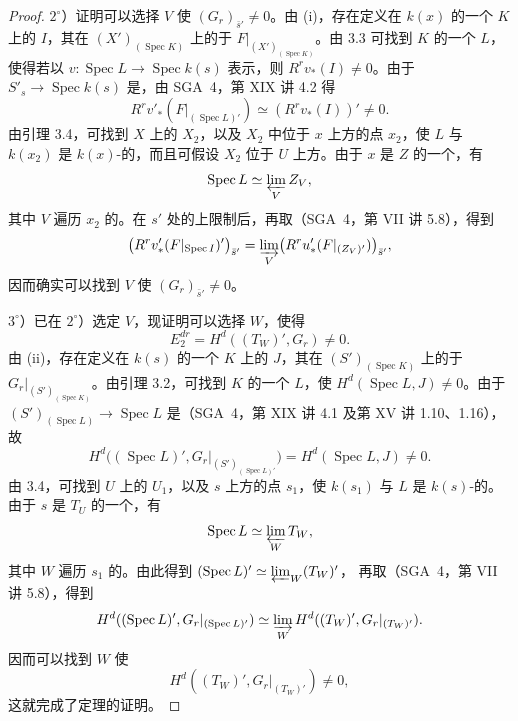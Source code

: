 \begin{proof}
$2^\circ$）证明可以选择 $V$ 使 $(G_r)_{\bar s'}\ne0$。由 (i)，存在定义在 $k(x)$ 的一个 $K$ 上的 $I$，其在 $(X')_{(\operatorname{Spec}K)}$ 上的于 $F|_{(X')_{(\operatorname{Spec}K)}}$。由 3.3 可找到 $K$ 的一个 $L$，使得若以 $v:\operatorname{Spec}L\to\operatorname{Spec}k(s)$ 表示，则 $R^rv_*(I)\ne0$。由于 $S'_s\to\operatorname{Spec}k(s)$ 是，由 SGA~4，第 XIX 讲 4.2 得
\[
R^rv'_*(F|_{(\operatorname{Spec}L)'})\simeq(R^rv_*(I))'\ne0.
\]
由引理 3.4，可找到 $X$ 上的 $X_2$，以及 $X_2$ 中位于 $x$ 上方的点 $x_2$，使 $L$ 与 $k(x_2)$ 是 $k(x)$-的，而且可假设 $X_2$ 位于 $U$ 上方。由于 $x$ 是 $Z$ 的一个，有
\[
\operatorname{Spec}L\simeq\varprojlim_V Z_V,
\]
其中 $V$ 遍历 $x_2$ 的。在 $s'$ 处的上限制后，再取（SGA~4，第 VII 讲 5.8），得到
\[
\bigl(R^rv'_*(F|_{\operatorname{Spec}I})'\bigr)_{\bar s'}
=\varinjlim_V\bigl(R^ru'_*(F|_{(Z_V)'})\bigr)_{\bar s'},
\]
因而确实可以找到 $V$ 使 $(G_r)_{\bar s'}\ne0$。

$3^\circ$）已在 $2^\circ$）选定 $V$，现证明可以选择 $W$，使得
\[
E_2^{dr}=H^d((T_W)',G_r)\ne0.
\]
由 (ii)，存在定义在 $k(s)$ 的一个 $K$ 上的 $J$，其在 $(S')_{(\operatorname{Spec}K)}$ 上的于 $G_r|_{(S')_{(\operatorname{Spec}K)}}$。由引理 3.2，可找到 $K$ 的一个 $L$，使 $H^d(\operatorname{Spec}L,J)\ne0$。由于 $(S')_{(\operatorname{Spec}L)}\to\operatorname{Spec}L$ 是（SGA~4，第 XIX 讲 4.1 及第 XV 讲 1.10、1.16），故
\[
H^d\bigl((\operatorname{Spec}L)',G_r|_{(S')_{(\operatorname{Spec}L)'}}\bigr)
=H^d(\operatorname{Spec}L,J)\ne0.
\]
由 3.4，可找到 $U$ 上的 $U_1$，以及 $s$ 上方的点 $s_1$，使 $k(s_1)$ 与 $L$ 是 $k(s)$-的。由于 $s$ 是 $T_U$ 的一个，有
\[
\operatorname{Spec}L\simeq\varprojlim_W T_W,
\]
其中 $W$ 遍历 $s_1$ 的。由此得到 $(\operatorname{Spec}L)'\simeq\varprojlim_W(T_W)'$，
再取（SGA~4，第 VII 讲 5.8），得到
\[
H^d((\operatorname{Spec}L)',G_r|_{(\operatorname{Spec}L)'})
\simeq\varinjlim_WH^d((T_W)',G_r|_{(T_W)'}).
\]
因而可以找到 $W$ 使
\[
H^d((T_W)',G_r|_{(T_W)'})\ne0,
\]
这就完成了定理的证明。
\end{proof}

